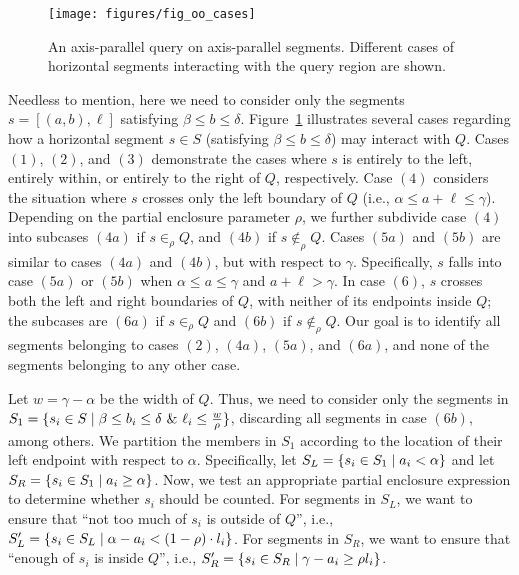 \begin{figure}[t]
\centering
\texttt{[image: figures/fig\_oo\_cases]}
\caption{An axis-parallel query on axis-parallel segments. Different cases 
of horizontal segments interacting with the query region are shown.}
\label{:fig:rectangles:ap:cases}
\end{figure}

Needless to mention, here we need to consider only the segments  
$s=[(a,b),\ell]$
satisfying $\beta \leq b \leq \delta$. 
Figure~\ref{:fig:rectangles:ap:cases} illustrates several cases 
regarding how a horizontal segment $s \in S$ (satisfying $\beta 
\leq b \leq \delta$) may interact with $Q$. 
Cases $(1)$, $(2)$, and $(3)$ demonstrate the cases where $s$ is 
entirely to the left, entirely within, or entirely to the right of $Q$, 
respectively. Case $(4)$ considers the situation where $s$ crosses 
only the left boundary of $Q$ (i.e., $\alpha \leq a+\ell \leq \gamma$). 
Depending on the partial enclosure parameter $\rho$, we further 
subdivide case $(4)$ into subcases $(4a)$ if $s \in_\rho Q$, and 
$(4b)$ if $s \not \in_\rho Q$. Cases $(5a)$ and $(5b)$ are similar 
to cases $(4a)$ and $(4b)$, but with respect to $\gamma$. Specifically, 
$s$ falls into case $(5a)$ or $(5b)$ when $\alpha \leq a \leq \gamma$ 
and $a+\ell > \gamma$. In case $(6)$, $s$ crosses both the left and right 
boundaries of $Q$, with neither of its endpoints inside $Q$;
the subcases are $(6a)$ if $s \in_\rho Q$ and $(6b)$ if $s \not 
\in_\rho Q$.
Our goal is to identify all segments belonging to cases $(2)$, $(4a)$, $(5a)$, 
and $(6a)$, and none of the segments belonging to any other case.

Let $w = \gamma - \alpha$ be the width of $Q$. Thus, we need to consider 
only the segments in $S_1 = \{s_i \in S \;|\; \beta \leq b_i \leq \delta 
~\&~ \ell_i \leq \frac{w}{\rho}\}$, discarding all segments in case $(6b)$, 
among others.
We partition the members in $S_1$ 
according to the location of their left endpoint with respect to $\alpha$. 
Specifically, let $S_L = \{s_i \in S_1 \;|\; a_i < \alpha\}$ and let 
$S_R = \{s_i \in S_1 \;|\; a_i \geq \alpha\}$.
Now, we test an appropriate partial enclosure expression to determine 
whether $s_i$ should be counted. For segments in $S_L$, we want to 
ensure that ``not too much of $s_i$ is outside of $Q$'', i.e., $S_L' 
= \{ s_i \in S_L \;|\; \alpha - a_i < (1 - \rho) \cdot l_i\}$.
For segments in $S_R$, we want to ensure that ``enough of $s_i$ is inside 
$Q$'', i.e., $S_R' = \{s_i \in S_R \;|\; \gamma - a_i \geq  \rho l_i\}$.

